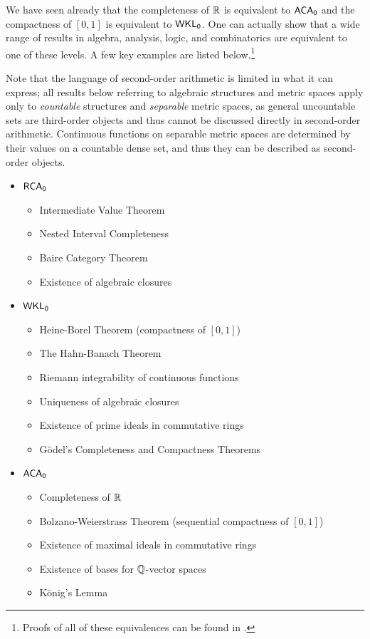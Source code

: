 \documentclass{amsart}
\begin{document}
	We have seen already that the completeness of $\mathbb{R}$ is equivalent to $\operatorname{\sf{ACA_0}}$ and the compactness of $[0,1]$ is equivalent to $\operatorname{\sf{WKL_0}}$. One can actually show that a wide range of results in algebra, analysis, logic, and combinatorics are equivalent to one of these levels. A few key examples are listed below.\footnote{Proofs of all of these equivalences can be found in \cite{simpson}.} 
	
	Note that the language of second-order arithmetic is limited in what it can express; all results below referring to algebraic structures and metric spaces apply only to \textit{countable} structures and \textit{separable} metric spaces, as general uncountable sets are third-order objects and thus cannot be discussed directly in second-order arithmetic. Continuous functions on separable metric spaces are determined by their values on a countable dense set, and thus they can be described as second-order objects.
	
	\begin{itemize}
		\item $\operatorname{\sf{RCA_0}}$
		\begin{itemize}
			\item Intermediate Value Theorem
			\item Nested Interval Completeness
			\item Baire Category Theorem 
			\item Existence of algebraic closures 
		\end{itemize}
		\item $\operatorname{\sf{WKL_0}}$
		\begin{itemize}
			\item Heine-Borel Theorem (compactness of $[0,1]$)
			\item The Hahn-Banach Theorem 
			\item Riemann integrability of continuous functions
			\item Uniqueness of algebraic closures 
			\item Existence of prime ideals in commutative rings
			\item G\"odel's Completeness and Compactness Theorems
		\end{itemize}
		\item $\operatorname{\sf{ACA_0}}$
		\begin{itemize}
			\item Completeness of $\mathbb{R}$
			\item Bolzano-Weierstrass Theorem (sequential compactness of $[0,1]$)
			\item Existence of maximal ideals in commutative rings
			\item Existence of bases for $\mathbb{Q}$-vector spaces
			\item K\"onig's Lemma
		\end{itemize}
	\end{itemize}
	
\end{document}
